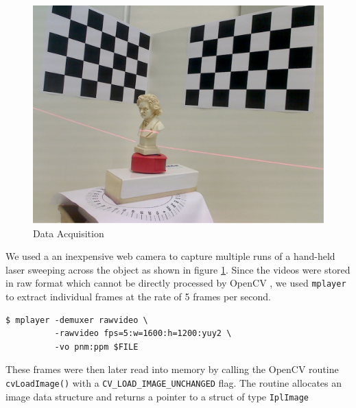 \begin{figure}[ht!]
\centering
\includegraphics[width=0.9\linewidth]{figures/introduction}
\caption{Data Acquisition}
\label{figure:acquisition}
\end{figure}

We used a an inexpensive web camera to capture multiple runs of a hand-held
laser sweeping across the object as shown in figure \ref{figure:acquisition}.
Since the videos were stored in raw format which cannot be directly processed
by OpenCV \cite{bradski:2008}, we used \texttt{mplayer} to extract individual
frames at the rate of 5 frames per second.

\begin{verbatim}
$ mplayer -demuxer rawvideo \
          -rawvideo fps=5:w=1600:h=1200:yuy2 \
          -vo pnm:ppm $FILE
\end{verbatim}

These frames were then later read into memory by calling the OpenCV routine
\texttt{cvLoadImage()} with a \texttt{CV\_LOAD\_IMAGE\_UNCHANGED} flag. The
routine allocates an image data structure and returns a pointer to a struct of
type \texttt{IplImage}

